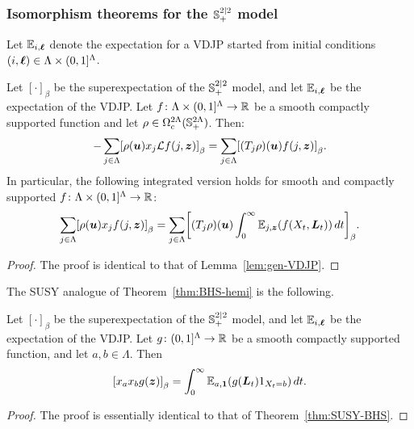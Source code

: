 \documentclass[11pt,a4paper]{article}
\begin{document}
\subsubsection{Isomorphism theorems for the ${\mathbb S}^{2|2}_{+}$ model}
\label{sec:isom-theor-S22}

Let $\mathbb{E}_{i,\boldsymbol{\ell}}$ denote the expectation for a VDJP started from
initial conditions $(i,\boldsymbol{\ell})\in\Lambda\times(0,1]^{\Lambda}$. 
\begin{lemma}
  \label{lem:gen-SUSY-S22}
  Let $[\cdot]_\beta$ be the superexpectation of the ${\mathbb S}_+^{2|2}$ model, and let $\mathbb{E}_{i,\boldsymbol{\ell}}$ be the expectation of the VDJP.
  Let $f\colon \Lambda\times (0,1]^{\Lambda} \to \mathbb{R}$ be a smooth
  compactly supported function and let
  $\rho \in \Omega_{c}^{2\Lambda}({\mathbb S}_+^{2\Lambda})$.  Then:
  \begin{equation}
    \label{eq:gen-S22-1}
    -\sum_{j\in\Lambda}\cb{\rho(\V{u})x_{j}  \cL f(j, \V{z})}_{\beta}
    =
    \sum_{j\in\Lambda} \cb{(T_j\rho)(\V{u})f(j,\V{z})}_{\beta}
    .
  \end{equation}
  In particular, the following integrated version holds for smooth and 
  compactly supported $f\colon\Lambda\times(0,1]^{\Lambda}\to\mathbb{R}$:
  \begin{equation}
	\label{eq:generic-iso-S22}
	\sum_{j\in\Lambda}\uspin{\rho(\V{u})x_{j} f(j, \V{z})}_{\beta}
	=
	\sum_{j\in\Lambda} \uspin{(T_j\rho)(\V{u})\int_0^\infty
          \E_{j,\V{z}}(f(X_t,\V{L}_t))\,dt}_{\beta} 
	.
      \end{equation}
\end{lemma}
\begin{proof}
  The proof is identical to that of Lemma~\ref{lem:gen-VDJP}.
\end{proof}

The SUSY analogue of Theorem~\ref{thm:BHS-hemi} is the following. 

\begin{theorem}
  \label{thm:SUSY-hem}
  Let $[\cdot]_\beta$ be the superexpectation of the ${\mathbb S}_+^{2|2}$ model, and let $\mathbb{E}_{i,\boldsymbol{\ell}}$ be the expectation of the VDJP.
  Let $g\colon (0,1]^{\Lambda}\to \mathbb{R}$ be a smooth compactly supported
  function, and let $a,b\in\Lambda$. Then
  \begin{equation}
    \label{eq:S22-iso}
    \uspin{x_{a}x_{b}g(\V{z})}_{\beta} =
    \int_{0}^{\infty}\E_{a,\V{1}}(g(\V{L}_{t})1_{X_t = b})\,dt.
  \end{equation}
\end{theorem}
\begin{proof}
  The proof is essentially identical to that of Theorem~\ref{thm:SUSY-BHS}.
\end{proof}
\end{document}
